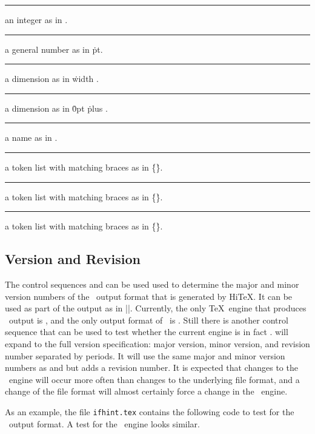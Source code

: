 \medskip
\rule{}: 
  an integer as in  .
\rule{}: 
  a general number as in  \.{pt}.
\rule{}:
  a dimension as in  \.{width} .
\rule{}:
  a dimension as in  \.{0pt} \.{plus} .
\rule{}:
  a name as in  .
\rule{}:
  a token list  with matching braces as in
  \.{\{}\.{\}}.
\rule{}:
  a token list  with matching braces as in
  \.{\{}\.{\}}.
\rule{}:
  a token list with matching braces as in
  \.{\{}\.{\}}.
\medskip
\enditemize

\subsection{Version and Revision}
The control sequences 
and  can be used
used to determine the major and minor version numbers of the \HINT\ output format
that is generated by Hi\TeX. It can be used as part of the output as 
in \verbatim|\the\HINTversion|. Currently, the only \TeX\ engine that produces
\HINT\ output is \HiTeX, and the only output format of \HiTeX\ is \HINT.
Still there is another control sequence
 that can be used
to test whether the current engine is in fact \HiTeX.
 will expand to the full version specification: major version,
minor version, and revision number separated by periods.
It will use the same major and minor version numbers as
 and  but adds a
revision number. It is expected that changes to the \HiTeX\ engine
will occur more often than changes to the underlying file format, and a change
of the file format will almost certainly force a change in the \HiTeX\ engine.

As an example, the file {\tt ifhint.tex}
contains the following code to test for the \HINT\ output format. A test for
the \HiTeX\ engine looks similar.

